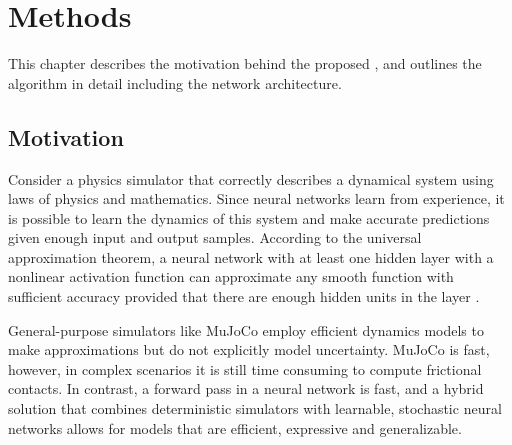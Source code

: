 \chapter{Methods}
\label{methods}

This chapter describes the motivation behind the proposed \dettostoc{}, and outlines the algorithm in detail including the network architecture.

\section{Motivation}


Consider a physics simulator that correctly describes a dynamical system using laws of physics and mathematics. Since neural networks learn from experience, it is possible to learn the dynamics of this system and make accurate predictions given enough input and output samples. According to the universal approximation theorem, a neural network with at least one hidden layer with a nonlinear activation function can approximate any smooth function with sufficient accuracy provided that there are enough hidden units in the layer \parencite{Hornik1989} \parencite{Cybenko1989}.


General-purpose simulators like MuJoCo employ efficient dynamics models to make approximations but do not explicitly model uncertainty. MuJoCo is fast, however, in complex scenarios it is still time consuming to compute frictional contacts. In contrast, a forward pass in a neural network is fast, and a hybrid solution that combines deterministic simulators with learnable, stochastic neural networks allows for models that are efficient, expressive and generalizable.


